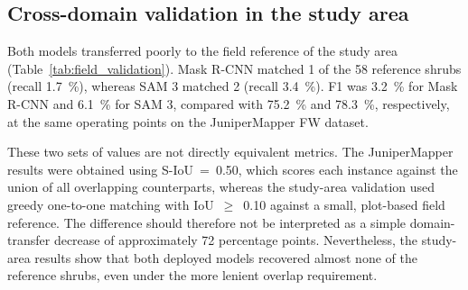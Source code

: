 \documentclass[12pt,a4paper]{article}
\begin{document}
\subsection{Cross-domain validation in the study area}

Both models transferred poorly to the field reference of the study area (Table~\ref{tab:field_validation}). Mask R-CNN matched 1 of the 58 reference shrubs (recall \qty{1.7}{\percent}), whereas SAM 3 matched 2 (recall \qty{3.4}{\percent}). F1 was \qty{3.2}{\percent} for Mask R-CNN and \qty{6.1}{\percent} for SAM 3, compared with \qty{75.2}{\percent} and \qty{78.3}{\percent}, respectively, at the same operating points on the JuniperMapper FW dataset.

These two sets of values are not directly equivalent metrics. The JuniperMapper results were obtained using S-IoU~=~0.50, which scores each instance against the union of all overlapping counterparts, whereas the study-area validation used greedy one-to-one matching with IoU~$\geq$~0.10 against a small, plot-based field reference. The difference should therefore not be interpreted as a simple domain-transfer decrease of approximately 72 percentage points. Nevertheless, the study-area results show that both deployed models recovered almost none of the reference shrubs, even under the more lenient overlap requirement.

\begin{table}[ht]
    \centering
    \caption{
        Accuracy of the deployed shrub maps against the field reference (58 shrubs, 21 trees) before LiDAR refinement. Scored predictions are the true plus false positives. Mean IoU is calculated over the matched shrubs and is reported on a 0--1 scale. Trees matched is the number of reference trees matched by a prediction, and tree commission is that number as a percentage of the 21 reference trees.
    }
    \label{tab:field_validation}
\end{table}
\end{document}

